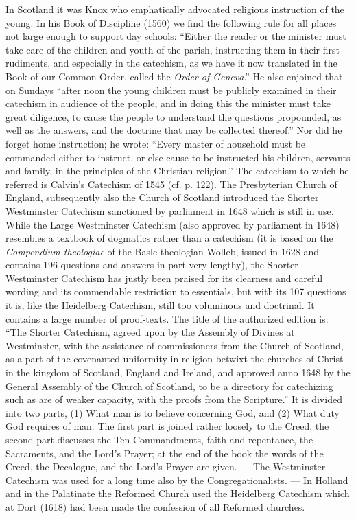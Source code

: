 In Scotland it was Knox who emphatically advocated religious instruction of the young. In his Book of Discipline (1560) we find the following rule for all places not large
enough to support day schools: “Either the reader or the minister must take care of the children and youth of the parish, instructing them in their first rudiments, and especially in the catechism, as we have it now translated in the Book of our Common Order, called the \emph{\emph{Order of Geneva}}.” He also enjoined that on Sundays “after noon the young children must be publicly examined in their catechism in audience of the people, and in doing this the minister must take great diligence, to cause the people to understand the questions propounded, as well as the answers, and the doctrine that may be collected thereof.” Nor did he forget home instruction; he wrote: “Every master of household must be commanded either to instruct, or else cause to be instructed his children, servants and family, in the principles of the Christian religion.” The catechism to which he referred is Calvin’s Catechism of 1545 (cf. p. 122). The Presbyterian Church of England, subsequently also the Church of Scotland introduced the Shorter Westminster Catechism sanctioned by parliament in 1648 which is still in use. While the Large Westminster Catechism (also approved by parliament in 1648) resembles a textbook of dogmatics rather than a catechism (it is based on the \emph{\emph{Compendium theologiae}} of the Basle theologian Wolleb, issued in 1628 and contains 196 questions and answers in part very lengthy), the Shorter Westminster Catechism has justly been praised for its clearness and careful wording and its commendable restriction to essentials, but with its 107 questions it is, like the Heidelberg Catechism, still too voluminous and doctrinal. It contains a large number of proof-texts. The title of the authorized edition is: “The Shorter Catechism, agreed upon by the Assembly of Divines at Westminster, with the assistance of commissioners from the Church of Scotland, as a part of the covenanted uniformity in religion betwixt the churches of Christ in the kingdom of Scotland, England and Ireland, and approved
anno 1648 by the General Assembly of the Church of Scotland, to be a directory for catechizing such as are of weaker capacity, with the proofs from the Scripture.” It is divided into two parts, (1) What man is to believe concerning God, and (2) What duty God requires of man. The first part is joined rather loosely to the Creed, the second part discusses the Ten Commandments, faith and repentance, the Sacraments, and the Lord’s Prayer; at the end of the book the words of the Creed, the Decalogue, and the Lord’s Prayer are given. — The Westminster Catechism was used for a long time also by the Congregationalists. — In Holland and in the Palatinate the Reformed Church used the Heidelberg Catechism which at Dort (1618) had been made the confession of all Reformed churches.

